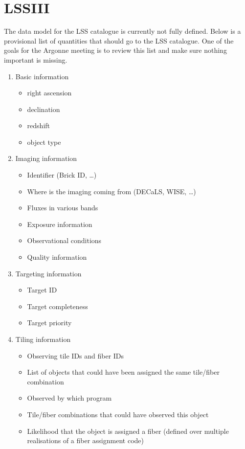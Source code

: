 \documentclass[11pt]{article}
\begin{document}
\section{LSSIII}

The data model for the LSS catalogue is currently not fully defined. Below is a
provisional list of quantities that should go to the LSS catalogue. One of the
goals for the Argonne meeting is to review this list and make sure nothing
important is missing.

\begin{enumerate}
\item Basic information
\begin{itemize}
\item right ascension
\item declination
\item redshift
\item object type
\end{itemize}
\item Imaging information
\begin{itemize}
\item Identifier (Brick ID, \ldots)
\item Where is the imaging coming from (DECaLS, WISE, \ldots)
\item Fluxes in various bands
\item Exposure information
\item Observational conditions
\item Quality information
\end{itemize}
\item Targeting information
\begin{itemize}
\item Target ID
\item Target completeness
\item Target priority
\end{itemize}
\item Tiling information
\begin{itemize}
\item Observing tile IDs and fiber IDs
\item List of objects that could have been assigned the same tile/fiber
combination
\item Observed by which program
\item Tile/fiber combinations that could have observed this object
\item Likelihood that the object is assigned a fiber (defined over multiple 
realisations of a fiber assignment code)

\end{itemize}
\end{enumerate}
\end{document}

